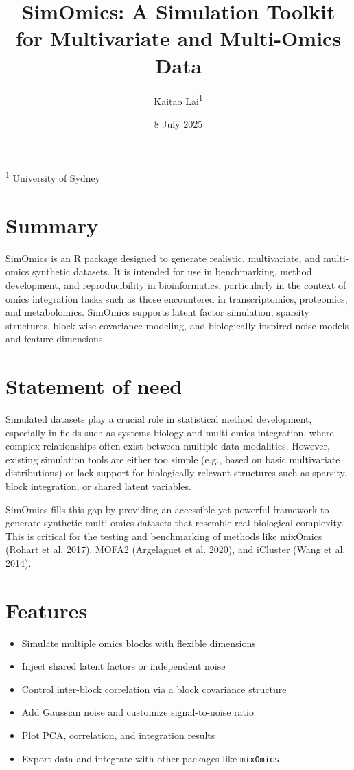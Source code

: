\documentclass[
]{article}
\title{SimOmics: A Simulation Toolkit for Multivariate and Multi-Omics
Data}
\author{Kaitao Lai\textsuperscript{1}}
\date{8 July 2025}
\providecommand{\tightlist}{%
  \setlength{\itemsep}{0pt}\setlength{\parskip}{0pt}}
\begin{document}
\maketitle

\textsuperscript{1} University of Sydney

\section{Summary}\label{summary}

SimOmics is an R package designed to generate realistic, multivariate,
and multi-omics synthetic datasets. It is intended for use in
benchmarking, method development, and reproducibility in bioinformatics,
particularly in the context of omics integration tasks such as those
encountered in transcriptomics, proteomics, and metabolomics. SimOmics
supports latent factor simulation, sparsity structures, block-wise
covariance modeling, and biologically inspired noise models and feature
dimensions.

\section{Statement of need}\label{statement-of-need}

Simulated datasets play a crucial role in statistical method
development, especially in fields such as systems biology and
multi-omics integration, where complex relationships often exist between
multiple data modalities. However, existing simulation tools are either
too simple (e.g., based on basic multivariate distributions) or lack
support for biologically relevant structures such as sparsity, block
integration, or shared latent variables.

SimOmics fills this gap by providing an accessible yet powerful
framework to generate synthetic multi-omics datasets that resemble real
biological complexity. This is critical for the testing and benchmarking
of methods like mixOmics (Rohart et al. 2017), MOFA2 (Argelaguet et al.
2020), and iCluster (Wang et al. 2014).

\section{Features}\label{features}

\begin{itemize}
\tightlist
\item
  Simulate multiple omics blocks with flexible dimensions
\item
  Inject shared latent factors or independent noise
\item
  Control inter-block correlation via a block covariance structure
\item
  Add Gaussian noise and customize signal-to-noise ratio
\item
  Plot PCA, correlation, and integration results
\item
  Export data and integrate with other packages like \texttt{mixOmics}
\end{itemize}
\end{document}
